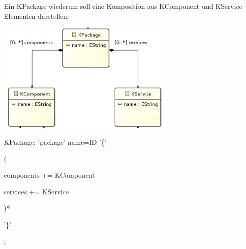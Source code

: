 \documentclass[]{article}
\begin{document}
Ein KPackage wiederum soll eine Komposition aus KComponent und KService
Elementen darstellen:

\includegraphics[width=3.45830in,height=2.12520in]{./Pictures/100002010000019F000000FFAC91D652B890571C.png}

KPackage: 'package' name=ID '\{'

(

components += KComponent \textbar{}

services += KService

)*

'\}'

;
\end{document}
